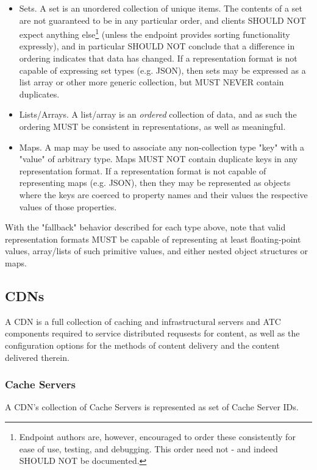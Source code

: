 \begin{itemize}
	\begin{itemize}
		\item Sets. A set is an unordered collection of unique items. The
		contents of a set are not guaranteed to be in any particular order, and
		clients SHOULD NOT expect anything else\footnote{Endpoint authors are,
		however, encouraged to order these consistently for ease of use, testing,
		and debugging. This order need not - and indeed SHOULD NOT be documented.}
		(unless the endpoint provides sorting functionality expressly), and in
		particular SHOULD NOT conclude that a difference in ordering indicates
		that data has changed. If a representation format is not capable of
		expressing set types (e.g. JSON), then sets may be expressed as a list
		array or other more generic collection, but MUST NEVER contain duplicates.

		\item Lists/Arrays. A list/array is an \emph{ordered} collection of data,
		and as such the ordering MUST be consistent in representations, as well as
		meaningful.

		\item Maps. A map may be used to associate any non-collection type "key"
		with a "value" of arbitrary type. Maps MUST NOT contain duplicate keys in
		any representation format. If a representation format is not capable of
		representing maps (e.g. JSON), then they may be represented as objects
		where the keys are coerced to property names and their values the
		respective values of those properties.
	\end{itemize}
\end{itemize}

With the "fallback" behavior described for each type above, note that valid
representation formats MUST be capable of representing at least floating-point
values, array/lists of such primitive values, and either nested object structures
or maps.

\subsection{CDNs}
A CDN is a full collection of caching and infrastructural servers and ATC
components required to service distributed requsests for content, as well as the
configuration options for the methods of content delivery and the content
delivered therein.

\subsubsection{Cache Servers}
A CDN's collection of Cache Servers is represented as set of Cache Server IDs.

